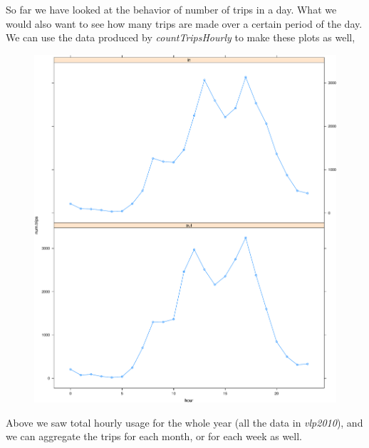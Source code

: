 \documentclass[]{article}
\begin{document}
So far we have looked at the behavior of number of trips in a day. What
we would also want to see how many trips are made over a certain period
of the day. We can use the data produced by \emph{countTripsHourly} to
make these plots as well,

\begin{figure}[htbp]
\centering
\includegraphics{velopassBirdsEye_files/figure-latex/hourlyusage-1.pdf}
\caption{}
\end{figure}

Above we saw total hourly usage for the whole year (all the data in
\emph{vlp2010}), and we can aggregate the trips for each month, or for
each week as well.
\end{document}
